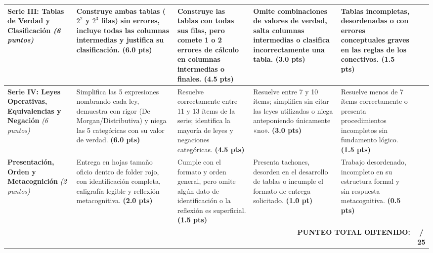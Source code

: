 \documentclass[11pt, letterpaper]{article}
\begin{document}
\begin{tabularx}{\textwidth}{|p{3.1cm}|X|X|X|X|c|}
\textbf{Serie III: Tablas de Verdad y Clasificación} \newline \textit{(6 puntos)} & 
Construye ambas tablas ($2^2$ y $2^3$ filas) sin errores, incluye todas las columnas intermedias y justifica su clasificación. \newline \textbf{(6.0 pts)} & 
Construye las tablas con todas sus filas, pero comete 1 o 2 errores de cálculo en columnas intermedias o finales. \newline \textbf{(4.5 pts)} & 
Omite combinaciones de valores de verdad, salta columnas intermedias o clasifica incorrectamente una tabla. \newline \textbf{(3.0 pts)} & 
Tablas incompletas, desordenadas o con errores conceptuales graves en las reglas de los conectivos. \newline \textbf{(1.5 pts)} & 
\hspace{0.7cm} \\
\hline

\textbf{Serie IV: Leyes Operativas, Equivalencias y Negación} \newline \textit{(6 puntos)} & 
Simplifica las 5 expresiones nombrando cada ley, demuestra con rigor (De Morgan/Distributiva) y niega las 5 categóricas con su valor de verdad. \newline \textbf{(6.0 pts)} & 
Resuelve correctamente entre 11 y 13 ítems de la serie; identifica la mayoría de leyes y negaciones categóricas. \newline \textbf{(4.5 pts)} & 
Resuelve entre 7 y 10 ítems; simplifica sin citar las leyes utilizadas o niega anteponiendo únicamente «no». \newline \textbf{(3.0 pts)} & 
Resuelve menos de 7 ítems correctamente o presenta procedimientos incompletos sin fundamento lógico. \newline \textbf{(1.5 pts)} & 
\hspace{0.7cm} \\
\hline

\textbf{Presentación, Orden y Metacognición} \newline \textit{(2 puntos)} & 
Entrega en hojas tamaño oficio dentro de folder rojo, con identificación completa, caligrafía legible y reflexión metacognitiva. \newline \textbf{(2.0 pts)} & 
Cumple con el formato y orden general, pero omite algún dato de identificación o la reflexión es superficial. \newline \textbf{(1.5 pts)} & 
Presenta tachones, desorden en el desarrollo de tablas o incumple el formato de entrega solicitado. \newline \textbf{(1.0 pt)} & 
Trabajo desordenado, incompleto en su estructura formal y sin respuesta metacognitiva. \newline \textbf{(0.5 pts)} & 
\hspace{0.7cm} \\
\hline

\multicolumn{5}{|r|}{\cellcolor{GrisTabla}\textbf{PUNTEO TOTAL OBTENIDO:}} & \cellcolor{GrisTabla}\textbf{/ 25} \\
\hline
\end{tabularx}
\end{document}
